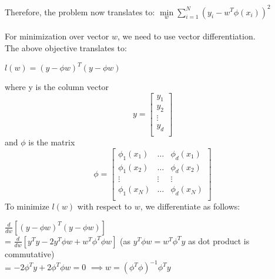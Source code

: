 \documentclass[12pt]{article}
\begin{document}
\noindent Therefore, the problem now translates to: $\min\limits_{w} \sum\limits_{i=1}^{N} (y_i - w^T\phi(x_i))^2$\\
\\
For minimization over vector $w$, we need to use vector differentiation.\\
The above objective translates to:\\
\begin{center}
    $l(w) = (y - \phi w)^T (y - \phi w)$
\end{center}
where y is the column vector
$$y =     \begin{bmatrix}
  y_1 \\
  y_2 \\
  \vdots \\
  y_d \\
 \end{bmatrix}
$$ 
and $\phi$ is the matrix
$$\phi =     \begin{bmatrix}
  \phi_1(x_1) & \dots & \phi_d(x_1) \\
  \phi_1(x_2) & \dots & \phi_d(x_2) \\
  \vdots & \vdots & \vdots\\
  \phi_1(x_N) & \dots & \phi_d(x_N) \\
 \end{bmatrix}
$$ 
To minimize $l(w)$ with respect to $w$, we differentiate as follows:\\
\begin{center}
    $\frac{d}{dw}[(y-\phi w)^T (y-\phi w)]$\\
    = $\frac{d}{dw}[y^Ty - 2y^T\phi w + w^T\phi^T \phi w]$ (as $y^T\phi w=w^T\phi^T y$ as dot product is commutative)\\
    = $-2\phi^T y + 2\phi^T \phi w = 0$
    $\implies w = (\phi^T \phi)^{-1} \phi^T y$
\end{center}
\end{document}
